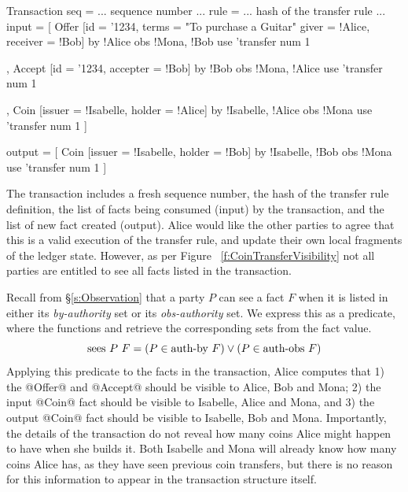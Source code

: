 \begin{small}
\begin{code}
Transaction
 seq    = ... sequence number ...
 rule   = ... hash of the transfer rule ...
 input  = [ Offer [id = '1234, terms = "To purchase a Guitar"
                   giver = !Alice, receiver = !Bob]
            by  {!Alice}            obs {!Mona, !Bob}
            use {'transfer}         num  1

          , Accept [id = '1234, accepter = !Bob]
            by  {!Bob}              obs {!Mona, !Alice}
            use {'transfer}         num 1

          , Coin   [issuer = !Isabelle, holder = !Alice]
            by  {!Isabelle, !Alice} obs {!Mona}
            use {'transfer}         num 1 ]

 output = [ Coin   [issuer = !Isabelle, holder = !Bob]
            by  {!Isabelle, !Bob}   obs {!Mona}
            use {'transfer}         num 1 ]
\end{code}
\end{small}

\eject{}
The transaction includes a fresh sequence number, the hash of the transfer rule definition, the list of facts being consumed (input) by the transaction, and the list of new fact created (output). Alice would like the other parties to agree that this is a valid execution of the transfer rule, and update their own local fragments of the ledger state. However, as per Figure ~\ref{f:CoinTransferVisibility} not all parties are entitled to see all facts listed in the transaction.

Recall from \S\ref{s:Observation} that a party $P$ can see a fact $F$ when it is listed in either its \emph{by-authority} set or its \emph{obs-authority} set. We express this as a predicate, where the functions  and  retrieve the corresponding sets from the fact value.
$$
\textrm{sees}~ P~ F = (P \in \textrm{auth-by}~F) \lor (P \in \textrm{auth-obs}~F)
$$
Applying this predicate to the facts in the transaction, Alice computes that 1) the @Offer@ and @Accept@ should be visible to Alice, Bob and Mona; 2) the input @Coin@ fact should be visible to Isabelle, Alice and Mona, and 3) the output @Coin@ fact should be visible to Isabelle, Bob and Mona. Importantly, the details of the transaction do not reveal how many coins Alice might happen to have when she builds it. Both Isabelle and Mona will already know how many coins Alice has, as they have seen previous coin transfers, but there is no reason for this information to appear in the transaction structure itself.


